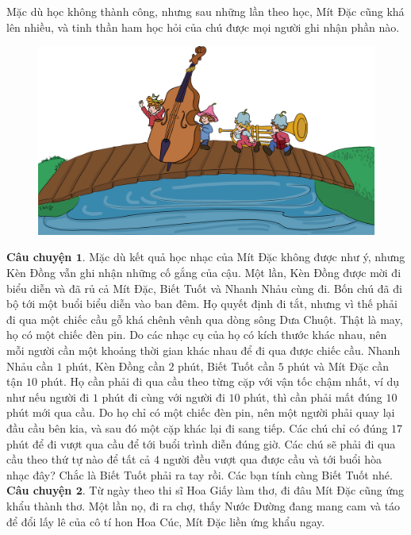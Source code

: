 	Mặc dù học không thành công, nhưng sau những lần theo học, Mít Đặc cũng khá lên nhiều, và tinh thần ham học hỏi của chú được mọi người ghi nhận phần nào.
	\vskip 0.1cm
	\begin{figure}
		\centering
		\vspace*{-15pt}
		\captionsetup{labelformat= empty, justification=centering}
		\includegraphics[width=1\linewidth]{Hinh3_KhiengNhacCu}
		\vspace*{-20pt}
	\end{figure}
	\textbf{\color{toancuabi}Câu chuyện $\pmb{1.}$} Mặc dù kết quả học nhạc của Mít Đặc không được như ý, nhưng Kèn Đồng vẫn ghi nhận những cố gắng của cậu. Một lần, Kèn Đồng được mời đi biểu diễn và đã rủ cả Mít Đặc, Biết Tuốt và Nhanh Nhảu cùng đi. Bốn chú đã đi bộ tới một buổi biểu diễn vào ban đêm. Họ quyết định đi tắt, nhưng vì thế phải đi qua một chiếc cầu gỗ khá chênh vênh qua dòng sông Dưa Chuột. Thật là may, họ có một chiếc đèn pin. Do các nhạc cụ của họ có kích thước khác nhau, nên mỗi người cần một khoảng thời gian khác nhau để đi qua được chiếc cầu. Nhanh Nhảu cần $1$ phút, Kèn Đồng cần $2$ phút, Biết Tuốt cần $5$ phút và Mít Đặc cần tận $10$ phút. Họ cần phải đi qua cầu theo từng cặp với vận tốc chậm nhất, ví dụ như nếu người đi $1$ phút đi cùng với người đi $10$ phút, thì cần phải mất đúng $10$ phút mới qua cầu. Do họ chỉ có một chiếc đèn pin, nên một người phải quay lại đầu cầu bên kia, và sau đó một cặp khác lại đi sang tiếp. Các chú chỉ có đúng $17$ phút để đi vượt qua cầu để tới buổi trình diễn đúng giờ. Các chú sẽ phải đi qua cầu theo thứ tự nào để tất cả $4$ người đều vượt qua được cầu và tới buổi hòa nhạc đây? Chắc là Biết Tuốt phải ra tay rồi. Các bạn tính cùng Biết Tuốt nhé.
	\vskip 0.1cm
	\textbf{\color{toancuabi}Câu chuyện $\pmb{2.}$} Từ ngày theo thi sĩ Hoa Giấy làm thơ, đi đâu Mít Đặc cũng ứng khẩu thành thơ. Một lần nọ, đi ra chợ, thấy Nước Đường đang mang cam và táo để đổi lấy lê của cô tí hon Hoa Cúc, Mít Đặc liền ứng khẩu ngay.
